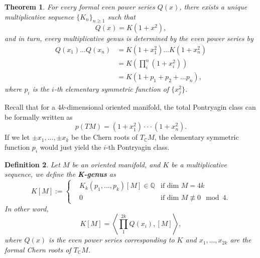 \documentclass[11pt]{article}
\newtheorem{thm}{Theorem}[section]
\newtheorem{dfn}[thm]{Definition}
\newcommand{\cplx}{\mathbb C}
\newcommand{\ratl}{\mathbb Q}
\begin{document}
 \begin{thm}
 	For every formal even power series $Q(x)$, there exists a unique multiplicative sequence $\{K_n\}_{n\geq1}$ such that
 	\begin{equation*}
 		Q(x)=K(1+x^2),
 	\end{equation*}
 	and in turn, every multiplicative genus is determined by the even power series by
 	\begin{equation*}
 	\begin{aligned}
 		Q(x_1)...Q(x_n)& =K(1+x_1^2)...K(1+x_n^2)\\
 			&=K\left(\prod_i^n(1+x_i^2)\right)\\
 			&=K\left(1+p_1+p_2+...p_n\right),
 	\end{aligned}
 	\end{equation*}
 	where $p_i$ is the $i$-th elementary symmetric function of $\{x_j^2\}$.
 \end{thm}
 Recall that for a $4k$-dimensional oriented manifold, the total Pontryagin class can be formally written as
 \begin{equation*}
 p(TM)=(1+x_1^2)\cdot\cdot\cdot(1+x_n^2).
 \end{equation*}
 If we let $\pm x_1,...,\pm x_k$ be the Chern roots of $T_\cplx M$, the elementary symmetric function $p_i$ would just yield the $i$-th Pontryagin class. 
 \begin{dfn} 
 	Let $M$ be an oriented manifold, and $K$ be a multiplicative sequence, we define the \textbf{K-genus} as 
 	\begin{equation*}
 	K[M]:=\left\{
 		\begin{aligned}
 			& K_k(p_1,...,p_k)[M]\in \ratl & \text{if dim }M=4k\\
 			& 0 & \text{if dim } M\not\equiv 0 \mod 4.
 		\end{aligned}
 		\right.
 	\end{equation*}
 	In other word, 
 	\begin{equation*}
 		K[M]=\left\langle\prod^{2k}_1Q(x_i),[M]\right\rangle,
 	\end{equation*}
 	 where $Q(x)$ is the even power series corresponding to $K$ and $x_1,...,x_{2k}$ are the formal Chern roots of $T_\cplx M$.
 	\end{dfn}
\end{document}
